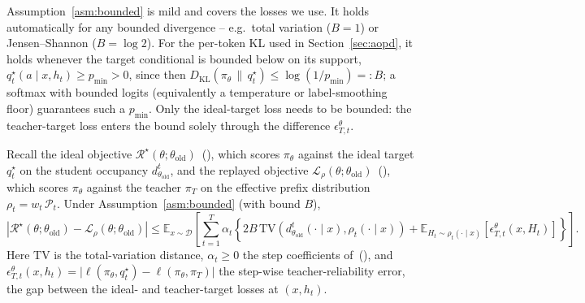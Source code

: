 Assumption~\ref{asm:bounded} is mild and covers the losses we use. It holds
automatically for any bounded divergence -- e.g.\ total variation (\(B=1\)) or
Jensen--Shannon (\(B=\log 2\)). For the per-token KL used in
Section~\ref{sec:aopd}, it holds whenever the target conditional is bounded below on
its support, \(q_t^\star(a\mid x,h_t)\ge p_{\min}>0\), since then
\(D_{\mathrm{KL}}(\pi_\theta\,\|\,q_t^\star)\le\log(1/p_{\min})=:B\); a softmax with
bounded logits (equivalently a temperature or label-smoothing floor) guarantees such
a \(p_{\min}\). Only the ideal-target loss needs to be bounded: the teacher-target
loss enters the bound solely through the difference \(\epsilon_{T,t}^{\theta}\).

\begin{proposition}
\label{prop:bound}
Recall the ideal objective
\(\mathcal R^\star(\theta;\theta_{\mathrm{old}})\)~(), which scores
\(\pi_\theta\) against the ideal target \(q_t^\star\) on the student occupancy
\(d_{\theta_{\mathrm{old}}}^{t}\), and the replayed objective
\(\mathcal L_\rho(\theta;\theta_{\mathrm{old}})\)~(), which scores
\(\pi_\theta\) against the teacher \(\pi_T\) on the effective prefix distribution
\(\rho_t=w_t\,\mathcal P_t\). Under Assumption~\ref{asm:bounded} (with bound \(B\)),
\begin{equation}
\label{eq:bound}
\left|
\mathcal R^\star(\theta;\theta_{\mathrm{old}})
-
\mathcal L_\rho(\theta;\theta_{\mathrm{old}})
\right|
\le
\mathbb E_{x\sim\mathcal D}
\left[
\sum_{t=1}^{T}
\alpha_t
\left\{
2B\,
\mathrm{TV}
\left(
d_{\theta_{\mathrm{old}}}^{t}(\cdot\mid x),
\rho_t(\cdot\mid x)
\right)
+
\mathbb E_{H_t\sim \rho_t(\cdot\mid x)}
\left[
\epsilon_{T,t}^{\theta}(x,H_t)
\right]
\right\}
\right].
\end{equation}
Here \(\mathrm{TV}\) is the total-variation distance, \(\alpha_t\ge0\) the step
coefficients of~(), and
\(\epsilon_{T,t}^{\theta}(x,h_t)=\bigl|\ell(\pi_\theta,q_t^\star)-\ell(\pi_\theta,\pi_T)\bigr|\)
the step-wise teacher-reliability error, the gap between the ideal- and teacher-target
losses at \((x,h_t)\).
\end{proposition}

